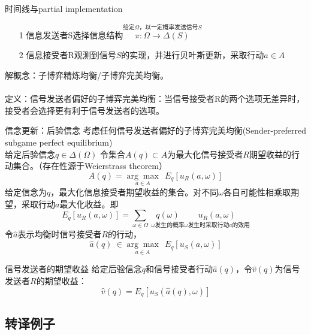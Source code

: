 \documentclass{beamer}
\begin{document}
\begin{frame}{时间线与partial implementation}
	\begin{itemize}
		\item[1] 信息发送者S选择信息结构$\overset{\text{给定}\Omega\text{，以一定概率发送信号}S}{\pi:\Omega \to \Delta\left( S\right)} $
		\item[2] 信息接受者R观测到信号$S$的实现，并进行贝叶斯更新，采取行动$a\in A$
	\end{itemize}
	解概念：子博弈精炼均衡/子博弈完美均衡。\\~\\
	定义：信号发送者偏好的子博弈完美均衡：当信号接受者R的两个选项无差异时，接受者会选择更有利于信号发送者的选项。
\end{frame}

\begin{frame}{信念更新：后验信念}
	考虑任何信号发送者偏好的子博弈完美均衡(Sender-preferred subgame perfect equilibrium)\\
	给定后验信念$q\in\Delta\left( \Omega\right) $
	令集合$A\left( q\right) \subset A$为最大化信号接受者$R$期望收益的行动集合。（存在性源于Weierstrass theorem）
	$$A\left( q\right) =\underset{a\in A}{\arg\max}\ \  E_{q}\left[ u_{R} \left( a,\omega\right) \right] $$\pause 
	给定信念为$q$，最大化信息接受者期望收益的集合。对不同$\omega$各自可能性相乘取期望，采取行动$a$最大化收益。即
	$$E_{q}\left[ u_{R} \left( a,\omega\right) \right]=\sum_{\omega\in\Omega}\ \underset{\omega\text{发生的概率}}{ q\left(\omega\right)} \underset{\omega\text{发生时采取行动}a\text{的效用}}{u_{R}\left(a,\omega \right)} $$\pause
	令$\hat{a}$表示均衡时信号接受者$R$的行动，
	$$\hat{a}\left(q \right) \ \in \underset{a\in A}{\arg\max}\ \  E_{q}\left[ u_{S} \left( a,\omega\right) \right]$$
\end{frame}

\begin{frame}{信号发送者的期望收益}
	给定后验信念$q$和信号接受者行动$\hat{a}\left(q\right)$，令$\hat{v}\left(q\right)$为信号发送者$R$的期望收益：
	$$\hat{v}\left(q\right)=E_{q}\left[ u_{S} \left( \hat{a}\left(q\right),\omega\right) \right]$$
\end{frame}

\subsection{转译例子}
\end{document}
